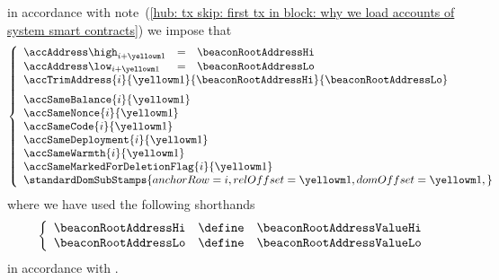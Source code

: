 \item[\underline{\underline{Loading the \inst{BEACONROOT} system smart contract:}}] 
	in accordance with
	note~(\ref{hub: tx skip: first tx in block: why we load accounts of system smart contracts})
	we impose that
	\[
		\left\{ \begin{array}{lclr}
			\accAddress  \high _{i + \roffTxSkipSysiBeaconRootSystemContractAccount} & = & \beaconRootAddressHi \\
			\accAddress  \low  _{i + \roffTxSkipSysiBeaconRootSystemContractAccount} & = & \beaconRootAddressLo \\
			\multicolumn{4}{l}{
				\accTrimAddress
				{i}{\roffTxSkipSysiBeaconRootSystemContractAccount}
				{\beaconRootAddressHi}
				{\beaconRootAddressLo}} \vspace{2mm} \\
			\multicolumn{3}{l}{\accSameBalance                       {i}{\roffTxSkipSysiBeaconRootSystemContractAccount}} \\
			\multicolumn{3}{l}{\accSameNonce                         {i}{\roffTxSkipSysiBeaconRootSystemContractAccount}} \\
			\multicolumn{3}{l}{\accSameCode                          {i}{\roffTxSkipSysiBeaconRootSystemContractAccount}} \\
			\multicolumn{3}{l}{\accSameDeployment                    {i}{\roffTxSkipSysiBeaconRootSystemContractAccount}} \\
			\multicolumn{3}{l}{\accSameWarmth                        {i}{\roffTxSkipSysiBeaconRootSystemContractAccount}} \\
			\multicolumn{3}{l}{\accSameMarkedForDeletionFlag         {i}{\roffTxSkipSysiBeaconRootSystemContractAccount}} \\
			\multicolumn{3}{l}{
				\standardDomSubStamps {
					anchorRow = i                                              ,
					relOffset = \roffTxSkipSysiBeaconRootSystemContractAccount ,
					domOffset = \roffTxSkipSysiBeaconRootSystemContractAccount ,
				}
			} \\
		\end{array} \right.
	\]
	where we have used the following shorthands
	\[
		\left\{ \begin{array}{lcl}
			\beaconRootAddressHi & \define & \beaconRootAddressValueHi \\
			\beaconRootAddressLo & \define & \beaconRootAddressValueLo \\
		\end{array} \right.
	\]
	in accordance with \cite{EIP-4788}.

